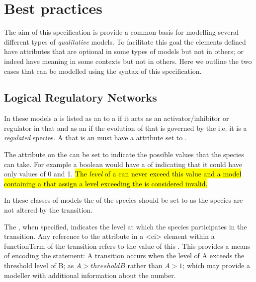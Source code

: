 
\section{Best practices}
\label{best-practices}

The aim of this specification is provide a common basis for modelling several different types of \textit{qualitative} models. To facilitate this goal the elements defined have attributes that are optional in some types of models but not in others; or indeed have meaning in some contexts but not in others.  Here we outline the two cases that can be modelled using the syntax of this specification.

\subsection{Logical Regulatory Networks}

In these models a \QualitativeSpecies is listed as an \Input to a \Transition if it acts as an activator/inhibitor or regulator in that \Transition and as an \Output if the evolution of that \QualitativeSpecies is governed by the \Transition i.e. it is a \textit{regulated} species. A \QualitativeSpecies that is an \Output must have a  attribute set to .

The  attribute on the \QualitativeSpecies can be set to indicate the possible values that the species can take. For example a boolean would have a  of  indicating that it could have only values of 0 and 1. \hl{The \emph{level} of a \QualitativeSpecies can never exceed this value and a model containing a \FunctionTerm that assign a level exceeding the  is considered invalid.}


In these classes of models the  of the \Input species should be set to  as the \Input species are not altered by the transition.


The , when specified, indicates the level at which the species participates in the transition. Any reference to the \Input {} attribute in a <ci> element within a functionTerm of the transition refers to the value of this . This provides a means of encoding the statement: A transition occurs when the level of A exceeds the threshold level of B; as $A > thresholdB$ rather than $A > 1$; which may provide a modeller with additional information about the number.



